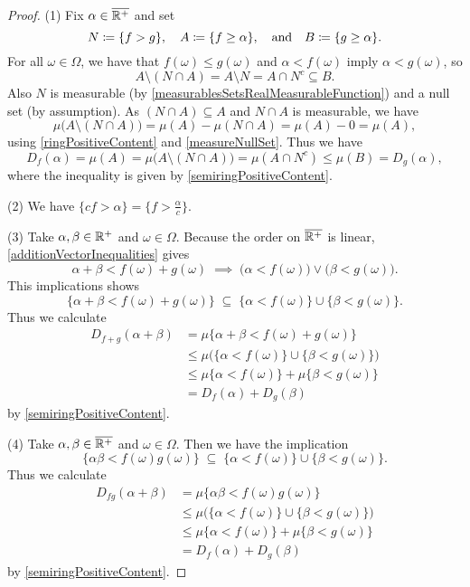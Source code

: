 \begin{proof}
(1) Fix $\alpha\in \overline{\mathbb{R}^+}$ and set
\[ N \coloneqq \{f > g\}, \quad A \coloneqq \{f \geq \alpha\}, \quad\text{and}\quad B \coloneqq \{g \geq \alpha\}. \]
For all $\omega\in\Omega$, we have that $f(\omega)\leq g(\omega)$ and $\alpha < f(\omega)$ imply $\alpha < g(\omega)$, so
\[ A\setminus (N\cap A) = A\setminus N = A\cap N^c \subseteq B. \]
Also $N$ is measurable (by \ref{measurablesSetsRealMeasurableFunction}) and a null set (by assumption). 
As $(N\cap A) \subseteq A$ and $N\cap A$ is measurable, we have \[ \mu\big(A\setminus (N\cap A)\big) = \mu(A) - \mu(N\cap A) = \mu(A) - 0 = \mu(A), \]
using \ref{ringPositiveContent} and \ref{measureNullSet}. Thus we have
\[ D_f(\alpha) = \mu(A) = \mu\big(A\setminus (N\cap A)\big) = \mu(A\cap N^c) \leq \mu(B) = D_g(\alpha), \]
where the inequality is given by \ref{semiringPositiveContent}.

(2) We have $\{cf>\alpha\} = \{f>\frac{\alpha}{c}\}$.

(3) Take $\alpha,\beta\in \mathbb{R}^+$ and $\omega\in \Omega$. 
Because the order on $\overline{\mathbb{R}^+}$ is linear, \ref{additionVectorInequalities} gives
\[ \alpha + \beta < f(\omega) + g(\omega) \;\implies\; \big(\alpha < f(\omega)\big) \lor \big(\beta < g(\omega)\big). \]
This implications shows
\[ \{\alpha + \beta < f(\omega)+g(\omega)\} \;\subseteq\; \{\alpha < f(\omega)\} \cup \{\beta < g(\omega)\}. \]
Thus we calculate
\begin{align*}
D_{f+g}(\alpha+\beta) &= \mu\{\alpha + \beta < f(\omega)+g(\omega)\} \\
&\leq \mu\Big(\{\alpha < f(\omega)\} \cup \{\beta < g(\omega)\}\Big) \\
&\leq \mu\{\alpha < f(\omega)\} + \mu \{\beta < g(\omega)\} \\
&= D_f(\alpha) + D_g(\beta)
\end{align*}
by \ref{semiringPositiveContent}.

(4) Take $\alpha,\beta\in \overline{\mathbb{R}^+}$ and $\omega\in \Omega$. Then we have the implication
\[ \{\alpha\beta < f(\omega)g(\omega)\} \;\subseteq\; \{\alpha < f(\omega)\} \cup \{\beta < g(\omega)\}. \]
Thus we calculate
\begin{align*}
D_{fg}(\alpha+\beta) &= \mu\{\alpha\beta < f(\omega)g(\omega)\} \\
&\leq \mu\Big(\{\alpha < f(\omega)\} \cup \{\beta < g(\omega)\}\Big) \\
&\leq \mu\{\alpha < f(\omega)\} + \mu \{\beta < g(\omega)\} \\
&= D_f(\alpha) + D_g(\beta)
\end{align*}
by \ref{semiringPositiveContent}.
\end{proof}

